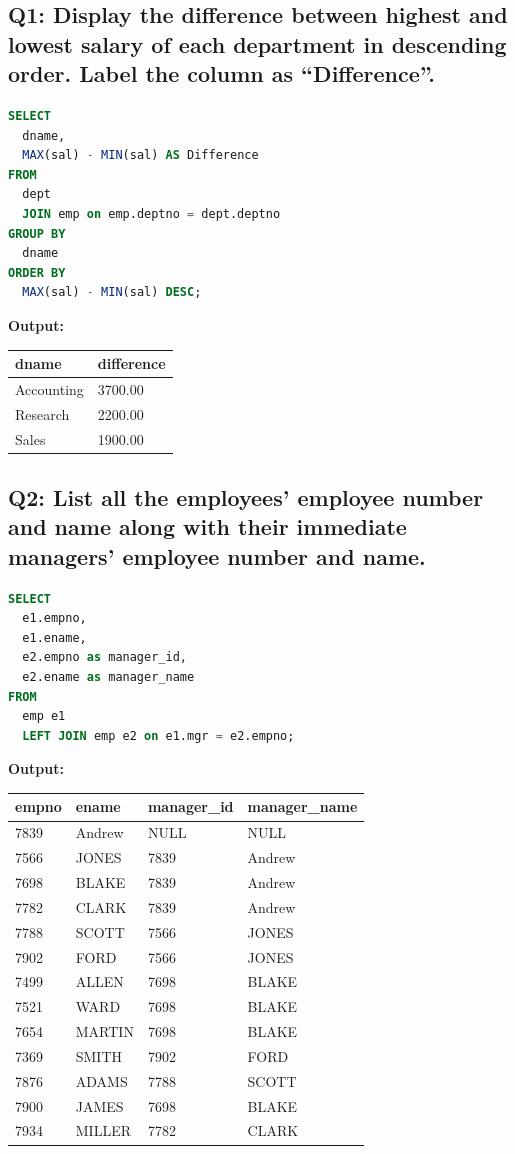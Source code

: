 \documentclass[11pt, a4paper]{article}
\begin{document}
\subsection*{Q1: Display the difference between highest and lowest salary of each department in descending order. Label the column as “Difference”.}
\begin{lstlisting}[language=SQL]
SELECT
  dname,
  MAX(sal) - MIN(sal) AS Difference
FROM
  dept
  JOIN emp on emp.deptno = dept.deptno
GROUP BY
  dname
ORDER BY
  MAX(sal) - MIN(sal) DESC;
\end{lstlisting}
\vspace{0.3cm}
\textbf{Output:}\vspace{0.2cm}
\begin{center}
\begin{tabular}{|l|l|}
\hline
\textbf{dname} & \textbf{difference} \\ \hline
Accounting & 3700.00 \\ \hline
Research & 2200.00 \\ \hline
Sales & 1900.00 \\ \hline
\end{tabular}
\end{center}
\newpage
\subsection*{Q2: List all the employees’ employee number and name along with their immediate managers’ employee number and name.}
\begin{lstlisting}[language=SQL]
SELECT
  e1.empno,
  e1.ename,
  e2.empno as manager_id,
  e2.ename as manager_name
FROM
  emp e1
  LEFT JOIN emp e2 on e1.mgr = e2.empno;
\end{lstlisting}
\vspace{0.3cm}
\textbf{Output:}\vspace{0.2cm}
\begin{center}
\begin{tabular}{|l|l|l|l|}
\hline
\textbf{empno} & \textbf{ename} & \textbf{manager\_id} & \textbf{manager\_name} \\ \hline
7839 & Andrew & NULL & NULL \\ \hline
7566 & JONES & 7839 & Andrew \\ \hline
7698 & BLAKE & 7839 & Andrew \\ \hline
7782 & CLARK & 7839 & Andrew \\ \hline
7788 & SCOTT & 7566 & JONES \\ \hline
7902 & FORD & 7566 & JONES \\ \hline
7499 & ALLEN & 7698 & BLAKE \\ \hline
7521 & WARD & 7698 & BLAKE \\ \hline
7654 & MARTIN & 7698 & BLAKE \\ \hline
7369 & SMITH & 7902 & FORD \\ \hline
7876 & ADAMS & 7788 & SCOTT \\ \hline
7900 & JAMES & 7698 & BLAKE \\ \hline
7934 & MILLER & 7782 & CLARK \\ \hline
\end{tabular}
\end{center}
\newpage
\end{document}
